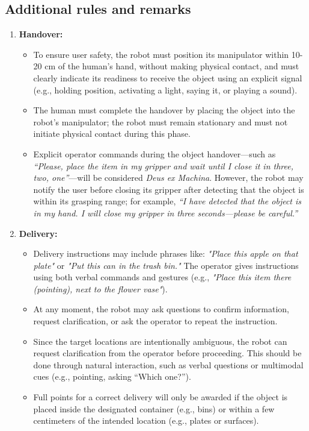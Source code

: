 \subsection*{Additional rules and remarks}
\begin{enumerate}[nosep]
	\item \textbf{Handover:}
	\begin{itemize}[nosep]
		\item To ensure user safety, the robot must position its manipulator within 10-20 cm of the human's hand, without making physical contact, and must clearly indicate its readiness to receive the object using an explicit signal (e.g., holding position, activating a light, saying it, or playing a sound).
		\item The human must complete the handover by placing the object into the robot's manipulator; the robot must remain stationary and must not initiate physical contact during this phase.
		\item Explicit operator commands during the object handover—such as \textit{“Please, place the item in my gripper and wait until I close it in three, two, one”}—will be considered \textit{Deus ex Machina}. However, the robot may notify the user before closing its gripper after detecting that the object is within its grasping range; for example, \textit{“I have detected that the object is in my hand. I will close my gripper in three seconds—please be careful.”}
	\end{itemize}
	\item \textbf{Delivery:}
	\begin{itemize}[nosep]
		\item Delivery instructions may include phrases like: \textit{"Place this apple on that plate"} or \textit{"Put this can in the trash bin."} The operator gives instructions using both verbal commands and gestures (e.g., \textit{"Place this item there} \textit{(pointing), next to the flower vase"}).
		\item At any moment, the robot may ask questions to confirm information, request clarification, or ask the operator to repeat the instruction.
		\item Since the target locations are intentionally ambiguous, the robot can request clarification from the operator before proceeding. This should be done through natural interaction, such as verbal questions or multimodal cues (e.g., pointing, asking “Which one?”). 
		\item Full points for a correct delivery will only be awarded if the object is placed inside the designated container (e.g., bins) or within a few centimeters of the intended location (e.g., plates or surfaces).

\end{itemize}
\end{enumerate}
